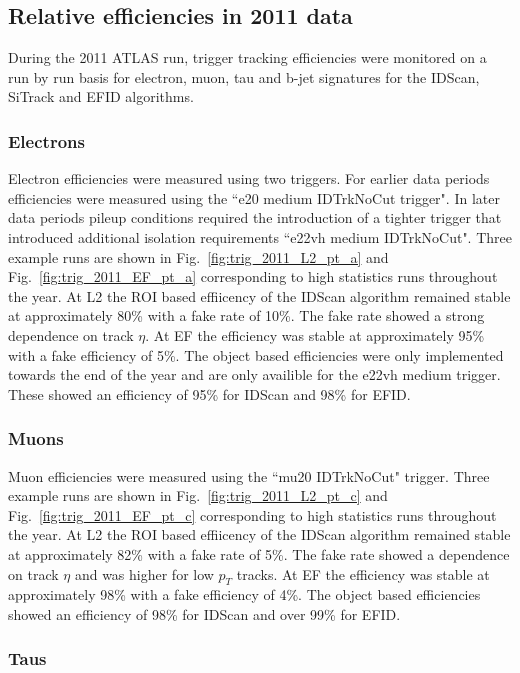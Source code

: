 \subsection{Relative efficiencies in 2011 data}

During the 2011 ATLAS run, trigger tracking efficiencies were monitored on a run by run basis for electron, muon, tau and b-jet signatures for the IDScan, SiTrack and EFID algorithms.

\subsubsection*{Electrons}
Electron efficiencies were measured using two triggers. For earlier data periods efficiencies were measured using the ``e20 medium IDTrkNoCut trigger". In later data periods pileup conditions required the introduction of a tighter trigger that introduced additional isolation requirements ``e22vh medium IDTrkNoCut". 
Three example runs are shown in Fig.~\ref{fig:trig_2011_L2_pt_a} and Fig.~\ref{fig:trig_2011_EF_pt_a} corresponding to high statistics runs throughout the year. At L2 the ROI based effiicency of the IDScan algorithm remained stable at approximately 80\% with a fake rate of 10\%. The fake rate showed a strong dependence on track $\eta$. At EF the efficiency was stable at approximately 95\% with a fake efficiency of 5\%. 
The object based efficiencies were only implemented towards the end of the year and are only availible for the e22vh medium trigger. These showed an efficiency of 95\% for IDScan and 98\% for EFID.

\subsubsection*{Muons}
Muon efficiencies were measured using the ``mu20 IDTrkNoCut" trigger. Three example runs are shown in Fig.~\ref{fig:trig_2011_L2_pt_c} and Fig.~\ref{fig:trig_2011_EF_pt_c} corresponding to high statistics runs throughout the year. At L2 the ROI based effiicency of the IDScan algorithm remained stable at approximately 82\% with a fake rate of 5\%. The fake rate showed a dependence on track $\eta$ and was higher for low $p_T$ tracks. At EF the efficiency was stable at approximately 98\% with a fake efficiency of 4\%. 
The object based efficiencies showed an efficiency of 98\% for IDScan and over 99\% for EFID.

\subsubsection*{Taus}

